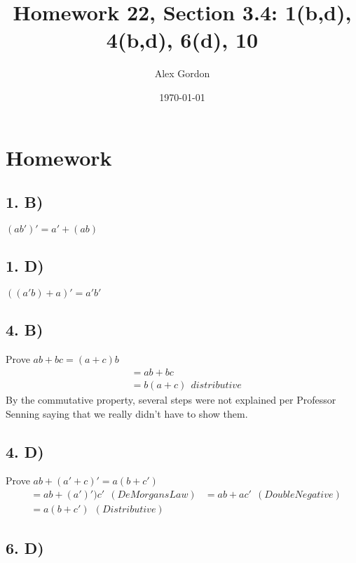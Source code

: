 \documentclass[12]{scrartcl}
\begin{document}
\title{Homework 22, Section 3.4: 1(b,d), 4(b,d), 6(d), 10 }
\author{Alex Gordon}
\date{\today}
\maketitle
\section*{Homework }
\subsection*{1. B)}
$(ab')'= a' + (ab)$
\subsection*{1. D)}
$((a'b) + a )' = a'b'$
\subsection*{4. B)}
Prove $ab + bc = (a+c)b$\
\begin{align*} 
&=ab + bc 
\\ &=  b(a + c) \ \ distributive
\end{align*}
By the commutative property, several steps were not explained per Professor Senning saying that we really didn't have to show them. 
\subsection*{4. D)}
Prove $ab + (a' + c)' = a(b+c')$\
\begin{align*} 
&=ab + (a')')c' \ \ (DeMorgans Law)
&= ab + ac'   \ \ (Double Negative)
\\ &= a(b + c')  \ \ (Distributive)
\end{align*}
\subsection*{6. D)}
\ \\
\ \\ 
\ \\
\ \\ 
\ \\
\
\end{document}
